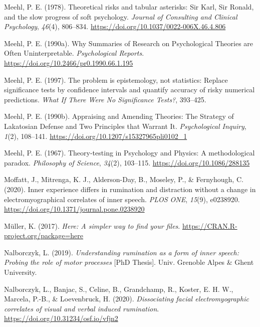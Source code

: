 \documentclass[
  english,
  man,floatsintext]{apa6}
\newlength{\cslhangindent}
\newenvironment{cslreferences}%
  {\setlength{\parindent}{0pt}%
  \everypar{\setlength{\hangindent}{\cslhangindent}}\ignorespaces}%
  {\par}
\begin{document}
\begin{cslreferences}
\leavevmode\hypertarget{ref-meehl_theoretical_1978}{}%
Meehl, P. E. (1978). Theoretical risks and tabular asterisks: Sir Karl, Sir Ronald, and the slow progress of soft psychology. \emph{Journal of Consulting and Clinical Psychology}, \emph{46}(4), 806--834. \url{https://doi.org/10.1037/0022-006X.46.4.806}

\leavevmode\hypertarget{ref-meehl_why_1990}{}%
Meehl, P. E. (1990a). Why Summaries of Research on Psychological Theories are Often Uninterpretable. \emph{Psychological Reports}. \url{https://doi.org/10.2466/pr0.1990.66.1.195}

\leavevmode\hypertarget{ref-harlow_problem_1997}{}%
Meehl, P. E. (1997). The problem is epistemology, not statistics: Replace significance tests by confidence intervals and quantify accuracy of risky numerical predictions. \emph{What If There Were No Significance Tests?}, 393--425.

\leavevmode\hypertarget{ref-meehl_appraising_1990-1}{}%
Meehl, P. E. (1990b). Appraising and Amending Theories: The Strategy of Lakatosian Defense and Two Principles that Warrant It. \emph{Psychological Inquiry}, \emph{1}(2), 108--141. \url{https://doi.org/10.1207/s15327965pli0102_1}

\leavevmode\hypertarget{ref-meehl_theory-testing_1967}{}%
Meehl, P. E. (1967). Theory-testing in Psychology and Physics: A methodological paradox. \emph{Philosophy of Science}, \emph{34}(2), 103--115. \url{https://doi.org/10.1086/288135}

\leavevmode\hypertarget{ref-moffatt_inner_2020}{}%
Moffatt, J., Mitrenga, K. J., Alderson-Day, B., Moseley, P., \& Fernyhough, C. (2020). Inner experience differs in rumination and distraction without a change in electromyographical correlates of inner speech. \emph{PLOS ONE}, \emph{15}(9), e0238920. \url{https://doi.org/10.1371/journal.pone.0238920}

\leavevmode\hypertarget{ref-R-here}{}%
Müller, K. (2017). \emph{Here: A simpler way to find your files}. \url{https://CRAN.R-project.org/package=here}

\leavevmode\hypertarget{ref-nalborczyk_understanding_2019}{}%
Nalborczyk, L. (2019). \emph{Understanding rumination as a form of inner speech: Probing the role of motor processes} {[}PhD Thesis{]}. Univ. Grenoble Alpes \& Ghent University.

\leavevmode\hypertarget{ref-nalborczyk_dissociating_2020}{}%
Nalborczyk, L., Banjac, S., Celine, B., Grandchamp, R., Koster, E. H. W., Marcela, P.-B., \& Loevenbruck, H. (2020). \emph{Dissociating facial electromyographic correlates of visual and verbal induced rumination}. \url{https://doi.org/10.31234/osf.io/vfjn2}


\end{cslreferences}
\end{document}
